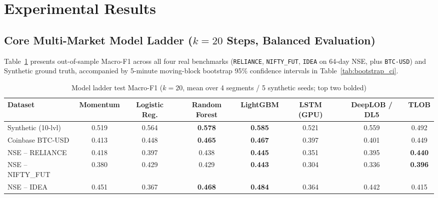 \documentclass[12pt,a4paper,oneside]{report}
\newcommand{\code}[1]{\texttt{#1}}
\begin{document}
\section{Experimental Results}

\subsection{Core Multi-Market Model Ladder (\texorpdfstring{$k = 20$}{k = 20} Steps, Balanced Evaluation)}

Table~\ref{tab:core_ladder} presents out-of-sample Macro-F1 across all four real benchmarks (\code{RELIANCE}, \code{NIFTY\_FUT}, \code{IDEA} on 64-day NSE, plus \code{BTC-USD}) and Synthetic ground truth, accompanied by 5-minute moving-block bootstrap 95\% confidence intervals in Table~\ref{tab:bootstrap_ci}.

\begin{table}[H]
\centering\scriptsize
\setlength{\tabcolsep}{3.8pt}
\caption{Model ladder test Macro-F1 ($k=20$, mean over 4 segments / 5 synthetic seeds; top two bolded)}
\label{tab:core_ladder}
\begin{tabular}{@{}lccccccc@{}}
\toprule
\textbf{Dataset} & \textbf{Momentum} & \textbf{Logistic Reg.} & \textbf{Random Forest} & \textbf{LightGBM} & \textbf{LSTM (GPU)} & \textbf{DeepLOB / DL5} & \textbf{TLOB} \\
\midrule
Synthetic (10-lvl) & 0.519 & 0.564 & \textbf{0.578} & \textbf{0.585} & 0.521 & 0.559 & 0.492 \\
Coinbase BTC-USD & 0.413 & 0.448 & \textbf{0.465} & \textbf{0.467} & 0.397 & 0.401 & 0.449 \\
NSE -- RELIANCE & 0.418 & 0.397 & 0.438 & \textbf{0.445} & 0.351 & 0.395 & \textbf{0.440} \\
NSE -- NIFTY\_FUT & 0.380 & 0.429 & 0.429 & \textbf{0.443} & 0.304 & 0.336 & \textbf{0.396} \\
NSE -- IDEA & 0.451 & 0.367 & \textbf{0.468} & \textbf{0.484} & 0.364 & 0.442 & 0.415 \\
\bottomrule
\end{tabular}
\end{table}
\end{document}
